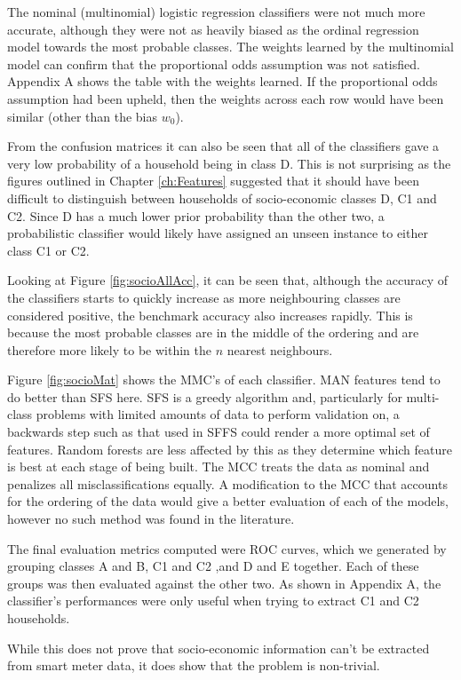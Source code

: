 The nominal (multinomial) logistic regression classifiers were not much more accurate, although they were not as heavily biased as the ordinal regression model towards the most probable classes. The weights learned by the multinomial model can confirm that  the proportional odds assumption was not satisfied.   Appendix A shows the table with the weights learned.  If the proportional odds assumption had been upheld, then the weights across each row would have been similar (other than the bias $w_0$).
\socioConf

From the confusion matrices it can also be seen that all of the classifiers gave a very low probability of a household being in class D. This is not surprising as the figures outlined in Chapter \ref{ch:Features} suggested that it should have been difficult to distinguish between households of socio-economic classes D, C1 and C2. Since D has a much lower prior probability than the other two, a probabilistic classifier would likely have assigned an unseen instance to either class C1 or C2.

Looking at Figure \ref{fig:socioAllAcc}, it can be seen that, although the accuracy of the classifiers starts to quickly increase as more neighbouring classes are considered positive, the benchmark accuracy also increases rapidly. This is because the most probable classes are in the middle of the ordering and are therefore more likely to be within the $n$ nearest neighbours.


\socioAllAcc

\socioMat

Figure \ref{fig:socioMat} shows the MMC's of each classifier. MAN features tend to do better than SFS here. SFS is a greedy algorithm and, particularly for multi-class problems with limited amounts of data to perform validation on,  a backwards step such as that used in SFFS could render a more optimal set of features. Random forests are less affected by this as they determine which feature is best at each stage of being built. The MCC treats the data as nominal and penalizes all misclassifications equally. A modification to the MCC that accounts for the ordering of the data would give a better evaluation of each of the models, however no such method was found in the literature.  

The final evaluation metrics computed were ROC curves, which we generated by grouping classes A and B, C1 and C2 ,and D and E together.  Each of these groups was then evaluated against the other two.  As shown in Appendix A, the classifier's performances were only useful when trying to extract C1 and C2 households.

While this does not prove that socio-economic information can't be extracted from smart meter data, it does show that the problem is non-trivial.